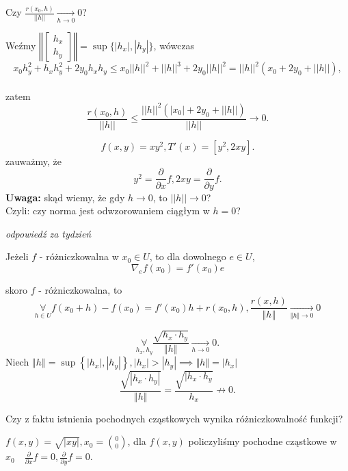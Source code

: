 \documentclass[../main.tex]{subfiles}
\begin{document}
\begin{pytanie}
    Czy $\frac{r(x_0,h)}{||h||}\underset{h \to 0}{\longrightarrow} 0$?
\end{pytanie}
Weźmy $\left\Vert \begin{bmatrix} h_x\\h_y \end{bmatrix} \right\Vert = \sup\{|h_x|,|h_y|\}$, wówczas\\
\[
    x_0h_y^2 + h_xh_y^2 + 2y_0h_xh_y \leq x_0 ||h||^2 + ||h||^3 + 2y_0||h||^2 = ||h||^2(x_0 +2y_0 + ||h||),
\]\\
zatem
\[
    \frac{r(x_0,h)}{||h||} \leq \frac{||h||^2(|x_0|+2y_0+||h||)}{||h||} \to 0.
\]

\[
    f(x,y)=xy^2, T'(x)=[y^2,2xy].
\]
zauważmy, że
\[
    y^2= \frac{\partial}{\partial x} f, 2xy = \frac{\partial}{\partial y} f.
\]
\textbf{Uwaga: }skąd wiemy, że gdy $h\to 0$, to $||h||\to 0$?\\
Czyli: czy norma jest odwzorowaniem ciągłym w $h=0$?

\textit{odpowiedź za tydzień}

\begin{tw}
Jeżeli $f$ - różniczkowalna w $x_0 \in U$, to dla dowolnego $e\in U$, $$\nabla_e f(x_0) = f'(x_0)e$$
\end{tw}

\begin{dowod}
    skoro $f$ - różniczkowalna, to
    \begin{equation}
        \label{eq: eq_2.1}
        \underset{h\in U}{\forall} f(x_0+h) - f(x_0) = f'(x_0)h + r(x_0,h), \frac{r(x,h)}{\Vert h \Vert } \underset{\Vert h \Vert \to 0}{\longrightarrow} 0
    \end{equation}

    \[
        \underset{h_x, h_y}{\forall} \frac{\sqrt{h_x\cdot h_y} }{\left\Vert h \right\Vert } \underset{h\to 0}{\longrightarrow} 0
    .\]
Niech $\left\Vert h \right\Vert = \sup \left\{ |h_x|, |h_y| \right\}, |h_x| > |h_y| \implies \left\Vert h \right\Vert = |h_x|$
\[
    \frac{\sqrt{|h_x \cdot h_y|} }{\left\Vert h \right\Vert } = \frac{\sqrt{|h_x \cdot h_y}}{h_x} \not \to  0
.\]


\end{dowod}


\begin{pytanie}
Czy z faktu istnienia pochodnych cząstkowych wynika różniczkowalność funkcji?
\end{pytanie}

\begin{przyklad}
\end{przyklad}
$f(x,y) = \sqrt{|xy|}, x_0=\binom{0}{0}$, dla $f(x,y)$ policzyliśmy pochodne cząstkowe w $x_0 \quad \frac{\partial}{\partial x} f = 0, \frac{\partial}{\partial y} f = 0$.
\vspace{0.3cm}
\end{document}
